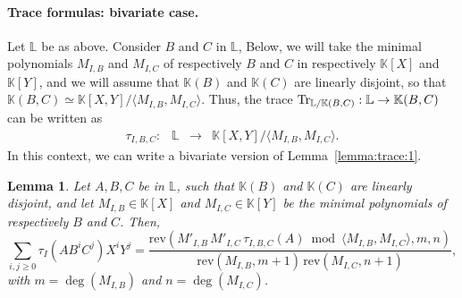 \documentclass[12pt]{article}
\def\K {\ensuremath{\mathbb{K}}}
\def\L {\ensuremath{\mathbb{L}}}
\def\rev {\ensuremath{\mathrm{rev}}}
\newtheorem{Lemma}{Lemma}
\begin{document}
\paragraph{Trace formulas: bivariate case.} 
Let $\L$ be as above. Consider $B$ and $C$ in $\L$, Below, we will
take the minimal polynomials $M_{I,B}$ and $M_{I,C}$ of respectively
$B$ and $C$ in respectively $\K[X]$ and $\K[Y]$, and we will assume
that $\K(B)$ and $\K(C)$ are linearly disjoint, so that $\K(B,C) \simeq
\K[X,Y]/\langle M_{I,B}, M_{I,C}\rangle$. Thus, the trace ${\rm
  Tr}_{\L/\K(B,C)}: \L \to \K(B,C)$
can be written as 
$$\begin{array}{cccc}
\tau_{I,B,C} :& \L& \to& \K[X,Y]/\langle M_{I,B}, M_{I,C} \rangle.
\end{array}$$
In this context, we can write a bivariate version of Lemma~\ref{lemma:trace:1}.
\begin{Lemma}
  Let $A, B, C$ be in $\L$, such that $\K(B)$ and $\K(C)$ are linearly
  disjoint, and let $M_{I,B}\in \K[X]$ and $M_{I,C}\in \K[Y]$ be the
  minimal polynomials of respectively $B$ and $C$. Then,
  $$\sum_{i,j \ge 0} \tau_I(A B^i C^j) X^i Y^j= 
  \frac{\rev( M'_{I,B}\, M'_{I,C}\, \tau_{I,B,C} (A) \bmod \langle M_{I,B}, M_{I,C}\rangle,m,n)}{\rev(M_{I,B},m+1)\, \rev(M_{I,C},n+1)},$$
  with $m=\deg(M_{I,B})$ and $n=\deg(M_{I,C})$.
\end{Lemma}
\end{document}
